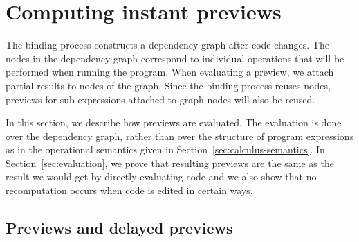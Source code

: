 \documentclass[english,crc]{programming}
\theoremstyle{plain}
\theoremstyle{definition}
\begin{document}

\section{Computing instant previews}
\label{sec:previews}

The binding process constructs a dependency graph after code changes. The nodes in the dependency
graph correspond to individual operations that will be performed when running the program. When
evaluating a preview, we attach partial results to nodes of the graph. Since the binding process
reuses nodes, previews for sub-expressions attached to graph nodes will also be reused.

In this section, we describe how previews are evaluated. The evaluation is done over the dependency
graph, rather than over the structure of program expressions as in the operational semantics
given in Section~\ref{sec:calculus-semantics}. In Section~\ref{sec:evaluation}, we prove that
resulting previews are the same as the result we would get by directly evaluating code and we
also show that no recomputation occurs when code is edited in certain ways.


\subsection{Previews and delayed previews}
\end{document}
